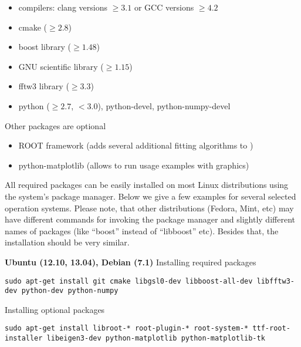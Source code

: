 \begin{itemize}
\item compilers: clang  versions $\geq 3.1$ or GCC versions $\geq 4.2$
\item cmake ($\geq 2.8$)
\item boost library ($\geq 1.48$)
\item GNU scientific library ($\geq 1.15$)
\item fftw3 library ($\geq 3.3$)
\item python ($\geq 2.7$, $< 3.0$), python-devel, python-numpy-devel
\end{itemize}
\vspace*{2mm}

Other packages are optional
\begin{itemize}
\item ROOT framework (adds several additional fitting algorithms to \BornAgain)
\item python-matplotlib (allows to run usage examples with graphics)
\end{itemize}

All required packages can be easily installed on most Linux distributions using the system's package
manager. Below we give a few examples for several selected operation systems. Please note,
that other distributions (Fedora, Mint, etc) may have different commands for invoking the package manager and slightly different names of packages (like ``boost'' instead of ``libboost'' etc). Besides that, the installation should be very similar.
\vspace*{3mm}


\noindent
{\large\bf Ubuntu (12.10, 13.04), Debian (7.1)} \newline
Installing required packages
\begin{lstlisting}[language=shell, style=commandline]
sudo apt-get install git cmake libgsl0-dev libboost-all-dev libfftw3-dev python-dev python-numpy
\end{lstlisting}

\noindent
Installing optional packages
\begin{lstlisting}[language=shell, style=commandline]
sudo apt-get install libroot-* root-plugin-* root-system-* ttf-root-installer libeigen3-dev python-matplotlib python-matplotlib-tk
\end{lstlisting}
\vspace*{3mm}


